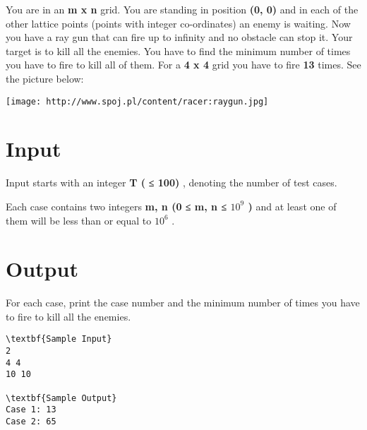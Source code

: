 

You are in an \textbf{ m x n } grid. You are standing in position \textbf{ (0, 0) } and in each of the other lattice points (points with integer co-ordinates) an enemy is waiting. Now you have a ray gun that can fire up to infinity and no obstacle can stop it. Your target is to kill all the enemies. You have to find the minimum number of times you have to fire to kill all of them. For a \textbf{ 4 x 4 } grid you have to fire \textbf{ 13 } times. See the picture below:


\texttt{[image: http://www.spoj.pl/content/racer:raygun.jpg]}

\section{Input}

Input starts with an integer \textbf{ T ( }\textbf{ ≤ 100) } , denoting the number of test cases.

Each case contains two integers \textbf{ m, n (0 ≤ m, n ≤ $10^{9}$ ) } and at least one of them will be less than or equal to \textbf{ $10^{6}$} .

\section{Output}

For each case, print the case number and the minimum number of times you have to fire to kill all the enemies.
\begin{verbatim}
\textbf{Sample Input}
2
4 4
10 10

\textbf{Sample Output}
Case 1: 13
Case 2: 65\end{verbatim}

 
